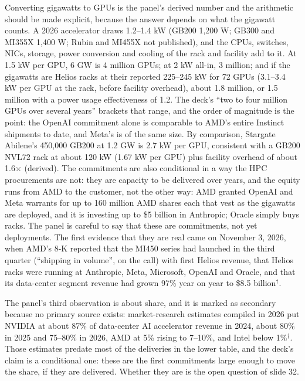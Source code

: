 \documentclass[11pt,letterpaper]{article}
\begin{document}
Converting gigawatts to GPUs is the panel's derived number and the arithmetic should be made explicit, because the answer depends on what the gigawatt counts. A 2026 accelerator draws 1.2--1.4 kW (GB200 1,200 W; GB300 and MI355X 1,400 W; Rubin and MI455X not published), and the CPUs, switches, NICs, storage, power conversion and cooling of the rack and facility add to it. At 1.5 kW per GPU, 6 GW is 4 million GPUs; at 2 kW all-in, 3 million; and if the gigawatts are Helios racks at their reported 225--245 kW for 72 GPUs (3.1--3.4 kW per GPU at the rack, before facility overhead), about 1.8 million, or 1.5 million with a power usage effectiveness of 1.2. The deck's ``two to four million GPUs over several years'' brackets that range, and the order of magnitude is the point: the OpenAI commitment alone is comparable to AMD's entire Instinct shipments to date, and Meta's is of the same size. By comparison, Stargate Abilene's 450,000 GB200 at 1.2 GW is 2.7 kW per GPU, consistent with a GB200 NVL72 rack at about 120 kW (1.67 kW per GPU) plus facility overhead of about 1.6$\times$ (derived). The commitments are also conditional in a way the HPC procurements are not: they are capacity to be delivered over years, and the equity runs from AMD to the customer, not the other way: AMD granted OpenAI and Meta warrants for up to 160 million AMD shares each that vest as the gigawatts are deployed, and it is investing up to \$5 billion in Anthropic; Oracle simply buys racks. The panel is careful to say that these are commitments, not yet deployments. The first evidence that they are real came on November 3, 2026, when AMD's 8-K reported that the MI450 series had launched in the third quarter (``shipping in volume'', on the call) with first Helios revenue, that Helios racks were running at Anthropic, Meta, Microsoft, OpenAI and Oracle, and that its data-center segment revenue had grown 97\% year on year to \$8.5 billion$^\dagger$.

The panel's third observation is about share, and it is marked as secondary because no primary source exists: market-research estimates compiled in 2026 put NVIDIA at about 87\% of data-center AI accelerator revenue in 2024, about 80\% in 2025 and 75--80\% in 2026, AMD at 5\% rising to 7--10\%, and Intel below 1\%$^\dagger$. Those estimates predate most of the deliveries in the lower table, and the deck's claim is a conditional one: these are the first commitments large enough to move the share, if they are delivered. Whether they are is the open question of slide 32.
\end{document}
